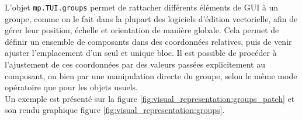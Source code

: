 \noindent L'objet \verb|mp.TUI.groups| permet de rattacher différents éléments de GUI à un groupe, comme on le fait dans la plupart des logiciels d'édition vectorielle, afin de gérer leur position, échelle et orientation de manière globale. Cela permet de définir un ensemble de composants dans des coordonnées relatives, puis de venir ajuster l'emplacement d'un seul et unique bloc. Il est possible de procéder à l'ajustement de ces coordonnées par des valeurs passées explicitement au composant, ou bien par une manipulation directe du groupe, selon le même mode opératoire que pour les objets usuels.\\
\indent Un exemple est présenté sur la figure \ref{fig:visual_representation:groups_patch} et son rendu graphique figure \ref{fig:visual_representation:groups}.

